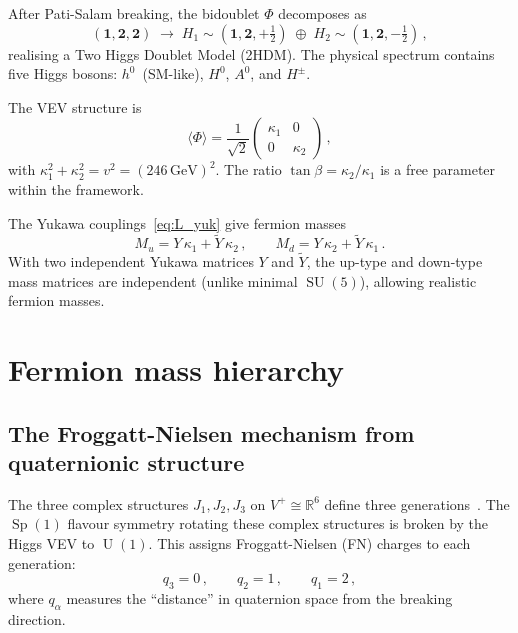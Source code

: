 \documentclass[12pt,a4paper]{article}
\theoremstyle{definition}
\newcommand{\SU}{\operatorname{SU}}
\newcommand{\Sp}{\operatorname{Sp}}
\newcommand{\U}{\operatorname{U}}
\newcommand{\R}{\mathbb{R}}
\begin{document}
After Pati-Salam breaking, the bidoublet $\Phi$ decomposes as
\begin{equation}
(\mathbf{1},\mathbf{2},\mathbf{2}) \;\to\; H_1 \sim (\mathbf{1},\mathbf{2},+\tfrac{1}{2}) \;\oplus\; H_2 \sim (\mathbf{1},\mathbf{2},-\tfrac{1}{2})\,,
\end{equation}
realising a Two Higgs Doublet Model (2HDM).
The physical spectrum contains five Higgs bosons: $h^0$~(SM-like), $H^0$, $A^0$, and $H^\pm$.

The VEV structure is
\begin{equation}
\langle\Phi\rangle = \frac{1}{\sqrt{2}} \begin{pmatrix} \kappa_1 & 0 \\ 0 & \kappa_2 \end{pmatrix}\,,
\end{equation}
with $\kappa_1^2 + \kappa_2^2 = v^2 = (246\,\mathrm{GeV})^2$.
The ratio $\tan\beta = \kappa_2/\kappa_1$ is a free parameter within the framework.

The Yukawa couplings~\eqref{eq:L_yuk} give fermion masses
\begin{equation}
M_u = Y\, \kappa_1 + \tilde{Y}\, \kappa_2\,, \qquad M_d = Y\, \kappa_2 + \tilde{Y}\, \kappa_1\,.
\end{equation}
With two independent Yukawa matrices $Y$ and $\tilde{Y}$, the up-type and down-type mass matrices are independent (unlike minimal $\SU(5)$), allowing realistic fermion masses.


\section{Fermion mass hierarchy}
\label{sec:masses}

\subsection{The Froggatt-Nielsen mechanism from quaternionic structure}

The three complex structures $J_1, J_2, J_3$ on $V^+ \cong \R^6$ define three generations~\cite{Paper5}.
The $\Sp(1)$ flavour symmetry rotating these complex structures is broken by the Higgs VEV to $\U(1)$.
This assigns Froggatt-Nielsen (FN) charges to each generation:
\begin{equation}
q_3 = 0\,, \qquad q_2 = 1\,, \qquad q_1 = 2\,,
\end{equation}
where $q_\alpha$ measures the ``distance'' in quaternion space from the breaking direction.
\end{document}
